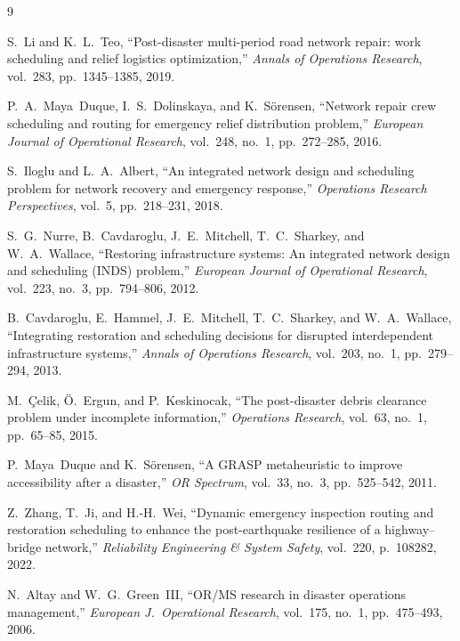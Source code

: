 \documentclass[10pt,conference,letterpaper]{IEEEtran}
\begin{document}
\begin{thebibliography}{9}

S.~Li and K.~L.~Teo, ``Post-disaster multi-period road network repair:
work scheduling and relief logistics optimization,''
\emph{Annals of Operations Research}, vol.~283, pp.~1345--1385, 2019.

P.~A.~Maya~Duque, I.~S.~Dolinskaya, and K.~S{\"o}rensen, ``Network repair
crew scheduling and routing for emergency relief distribution problem,''
\emph{European Journal of Operational Research}, vol.~248, no.~1,
pp.~272--285, 2016.

S.~Iloglu and L.~A.~Albert, ``An integrated network design and scheduling
problem for network recovery and emergency response,''
\emph{Operations Research Perspectives}, vol.~5, pp.~218--231, 2018.

S.~G.~Nurre, B.~Cavdaroglu, J.~E.~Mitchell, T.~C.~Sharkey, and
W.~A.~Wallace, ``Restoring infrastructure systems: An integrated network
design and scheduling (INDS) problem,''
\emph{European Journal of Operational Research}, vol.~223, no.~3,
pp.~794--806, 2012.

B.~Cavdaroglu, E.~Hammel, J.~E.~Mitchell, T.~C.~Sharkey, and
W.~A.~Wallace, ``Integrating restoration and scheduling decisions for
disrupted interdependent infrastructure systems,''
\emph{Annals of Operations Research}, vol.~203, no.~1, pp.~279--294, 2013.

M.~{\c{C}}elik, {\"O}.~Ergun, and P.~Keskinocak, ``The post-disaster
debris clearance problem under incomplete information,''
\emph{Operations Research}, vol.~63, no.~1, pp.~65--85, 2015.

P.~Maya~Duque and K.~S{\"o}rensen, ``A GRASP metaheuristic to improve
accessibility after a disaster,''
\emph{OR Spectrum}, vol.~33, no.~3, pp.~525--542, 2011.

Z.~Zhang, T.~Ji, and H.-H.~Wei, ``Dynamic emergency inspection routing and
restoration scheduling to enhance the post-earthquake resilience of a
highway--bridge network,''
\emph{Reliability Engineering \& System Safety}, vol.~220, p.~108282, 2022.

N.~Altay and W.~G.~Green~III, ``OR/MS research in disaster operations
management,''
\emph{European J.\ Operational Research}, vol.~175, no.~1,
pp.~475--493, 2006.


\end{thebibliography}
\end{document}
